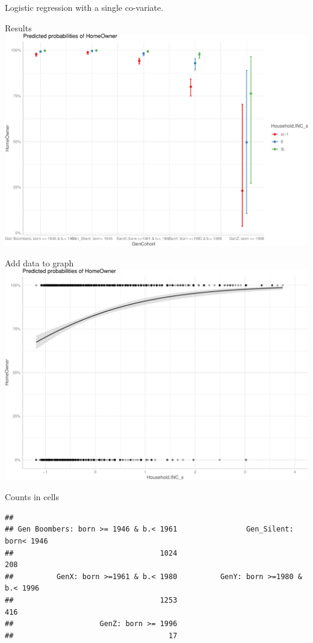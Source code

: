 \documentclass[
  ignorenonframetext,
]{beamer}
\begin{document}
\begin{frame}[fragile]{Logistic regression with a single co-variate.}
\begin{block}{Results}
\protect\hypertarget{results-1}{}
\includegraphics{slides_files/figure-beamer/unnamed-chunk-24-1.pdf}
\end{block}

\begin{block}{Add data to graph}
\protect\hypertarget{add-data-to-graph}{}
\includegraphics{slides_files/figure-beamer/unnamed-chunk-25-1.pdf}
\end{block}

\begin{block}{Counts in cells}
\protect\hypertarget{counts-in-cells}{}
\begin{verbatim}
## 
## Gen Boombers: born >= 1946 & b.< 1961                Gen_Silent: born< 1946 
##                                  1024                                   208 
##          GenX: born >=1961 & b.< 1980          GenY: born >=1980 & b.< 1996 
##                                  1253                                   416 
##                    GenZ: born >= 1996 
##                                    17
\end{verbatim}
\end{block}


\end{frame}
\end{document}
